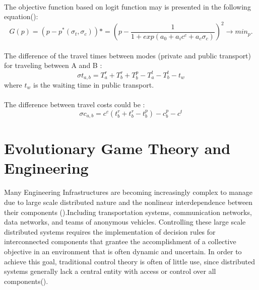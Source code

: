 \paragraph{}The objective function based on logit function may is presented in the following equation(\cite{Hollander et al, 2006}):
\begin{equation}
G(p) = (p - p^{*}(\sigma_t,\sigma_c))*
	 = (p - \frac{1}{1+exp(a_0+ a_i c^c + a_c \sigma_c)})^2 \rightarrow min_p.
\end{equation}
\paragraph{}The difference of the travel times between modes (private
and public transport) for traveling between A and B :
\begin{equation}
\sigma t_{a,b} = T^{r}_a + T^{r}_b + T^{p}_b - T^{t}_a - T^{t}_b - t_w
\end{equation}
where $t_w$ is the waiting time in public transport.
\paragraph{}The difference between travel costs could be : 
\begin{equation}
\sigma c_{a,b} = c^{c} ( t^{r}_b + t^{r}_b - t^{p}_b )- c^{p}_b - c^t
\end{equation}

\section{Evolutionary Game Theory and Engineering}
\paragraph{}Many Engineering Infrastructures are becoming increasingly complex to manage due to large scale distributed nature and the nonlinear interdependence between their components (\cite{Quijano et al, 2017}).Including transportation systems, communication networks, data networks, and teams of anonymous vehicles. Controlling these large scale distributed systems requires the implementation of decision rules for interconnected components that grantee the accomplishment of a collective objective in an environment that is often dynamic and uncertain. In order to achieve this goal, traditional control theory is often of little use, since distributed systems generally lack a central  entity with access or control over all components(\cite{Marden and Shamma, 2015}).